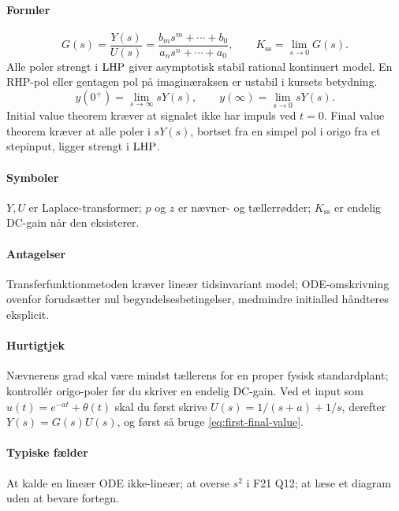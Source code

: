 \paragraph{Formler}
\begin{equation}
\label{eq:transfer-function-dc}
G(s)=\frac{Y(s)}{U(s)}=\frac{b_ms^m+\cdots+b_0}{a_ns^n+\cdots+a_0},
\qquad K_{\mathrm{ss}}=\lim_{s\to0}G(s).
\end{equation}
Alle poler strengt i \(\mathrm{LHP}\) giver asymptotisk stabil rational kontinuert model.
En RHP-pol eller gentagen pol på imaginæraksen er ustabil i kursets betydning.
\begin{equation}
\label{eq:first-final-value}
y(0^+)=\lim_{s\to\infty}sY(s),\qquad
y(\infty)=\lim_{s\to0}sY(s).
\end{equation}
Initial value theorem kræver at signalet ikke har impuls ved \(t=0\). Final value theorem
kræver at alle poler i \(sY(s)\), bortset fra en simpel pol i origo fra et stepinput,
ligger strengt i \(\mathrm{LHP}\).

\paragraph{Symboler}
\(Y,U\) er Laplace-transformer; \(p\) og \(z\) er nævner- og tællerrødder;
\(K_{\mathrm{ss}}\) er endelig DC-gain når den eksisterer.

\paragraph{Antagelser}
Transferfunktionmetoden kræver lineær tidsinvariant model; ODE-omskrivning ovenfor
forudsætter nul begyndelsesbetingelser, medmindre initialled håndteres eksplicit.

\paragraph{Hurtigtjek}
Nævnerens grad skal være mindst tællerens for en proper fysisk standardplant; kontrollér
origo-poler før du skriver en endelig DC-gain. Ved et input som \(u(t)=e^{-at}+\theta(t)\)
skal du først skrive \(U(s)=1/(s+a)+1/s\), derefter \(Y(s)=G(s)U(s)\), og først så bruge
\eqref{eq:first-final-value}.

\paragraph{Typiske fælder}
At kalde en lineær ODE ikke-lineær; at overse \(s^2\) i F21 Q12; at læse et diagram uden
at bevare fortegn.

